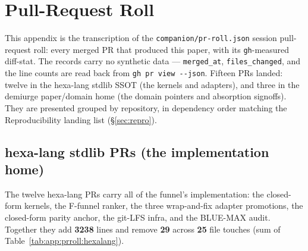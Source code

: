 \section{Pull-Request Roll}
\label{app:pr-roll}

This appendix is the transcription of the
\texttt{companion/\allowbreak pr-roll.json} session pull-request roll:
every merged PR that produced this paper, with its \texttt{gh}-measured
diff-stat. The records carry no synthetic data --- \texttt{merged\_at},
\texttt{files\_changed}, and the line counts are read back from
\texttt{gh pr view {-}{-}json}. Fifteen PRs landed: twelve in the
hexa-lang stdlib SSOT (the kernels and adapters), and three in the
demiurge paper/domain home (the domain pointers and absorption
signoffs). They are presented grouped by repository, in dependency
order matching the Reproducibility landing list (\S\ref{sec:repro}).

\subsection{hexa-lang stdlib PRs (the implementation home)}
\label{app:pr-roll:hexalang}

The twelve hexa-lang PRs carry all of the funnel's implementation: the
closed-form kernels, the F-funnel ranker, the three wrap-and-fix
adapter promotions, the closed-form parity anchor, the git-LFS infra,
and the BLUE-MAX audit. Together they add \textbf{3238} lines and remove
\textbf{29} across \textbf{25} file touches (sum of
Table~\ref{tab:app:prroll:hexalang}).

